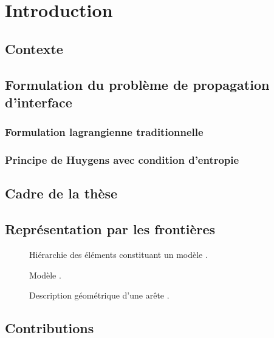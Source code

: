 \chapter{Introduction}

\section{Contexte}


\section{Formulation du problème de propagation d'interface}

\subsection{Formulation lagrangienne traditionnelle}

\subsection{Principe de Huygens avec condition d'entropie}


\section{Cadre de la thèse}


\section{Représentation par les frontières}




\begin{figure}
	\centering
	
	\caption{Hiérarchie des éléments constituant un modèle \brep.}
	\label{fig:BRep_hierarchy}
\end{figure}

\begin{figure}
	\centering
	
	\caption{Modèle \brep.}
	\label{fig:BRep}
\end{figure}

\begin{figure}
	\centering
	
	\caption{Description géométrique d'une arête \brep.}
\end{figure}




\section{Contributions}



